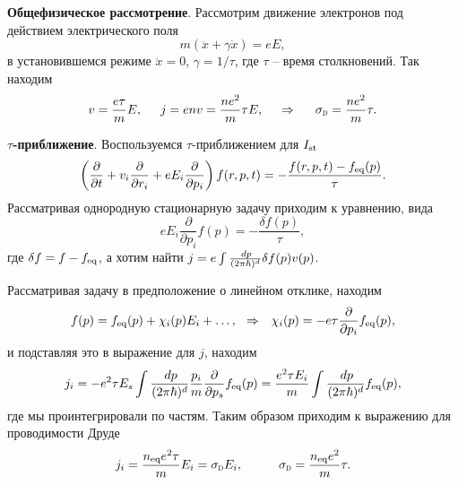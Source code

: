 

\textbf{Общефизическое рассмотрение}. 
Рассмотрим движение электронов под действием электрического поля
\begin{equation*}
	m (\ddot{x} + \gamma \dot{x}) = e E,
\end{equation*}
в установившемся режиме $\ddot{x} = 0$, $\gamma = 1/\tau$, где $\tau$ -- время столкновений. Так находим
\begin{equation*}
	v = \frac{e \tau}{m}E,
	\hspace{5 mm} 
	j = e n v = \frac{n e^2}{m} \tau E,
	\hspace{0.5cm} \Rightarrow \hspace{0.5cm}
	\sigD = \frac{n e^2}{m} \tau.
\end{equation*}

\textbf{$\tau$-приближение}. Воспользуемся $\tau$-приближением для $I_{\textnormal{st}}$
\begin{equation*}
	\left(
		\frac{\partial }{\partial t} + v_i \frac{\partial }{\partial r_i} + e E_i \frac{\partial }{\partial p_i} 
	\right) f(r, p, t) = - \frac{f(r, p, t) - f_{\textnormal{eq}} (p)}{\tau}.
\end{equation*}
Рассматривая однородную стационарную задачу приходим к уравнению, вида
\begin{equation*}
	e E_i \frac{\partial }{\partial p_i} f(p) = - \frac{\delta f(p)}{\tau},
\end{equation*}
где $\delta f = f - f_{\textnormal{eq}}$, а хотим найти $j = e \int \frac{\, d p}{(2 \pi \hbar)^d} \delta f(p) v(p)$.

Рассматривая задачу в предположение о линейном отклике, находим
\begin{equation*}
	f(p) = f_{\textnormal{eq}} (p) + \chi_i (p) E_i + \ldots,
	\hspace{0.25cm} \Rightarrow \hspace{0.25cm}
	\chi_i (p) = - e \tau \frac{\partial }{\partial p_i} f_{\textnormal{eq}} (p),
\end{equation*}
и подставляя это в выражение для $j$, находим
\begin{equation*}
	j_i = - e^2 \tau E_s \int \frac{\, d p}{(2 \pi \hbar)^d} \frac{p_i}{m} \frac{\partial }{\partial p_s} f_{\textnormal{eq}} (p) = \frac{e^2 \tau E_i}{m} \int \frac{\, d p}{(2 \pi \hbar)^d} f_{\textnormal{eq}} (p),
\end{equation*}
где мы проинтегрировали по частям. Таким образом приходим к выражению для проводимости Друде
\begin{equation*}
	 j_i = \frac{\sub{n}{eq} e^2 \tau}{m} E_i = \sigD E_i,
	 \hspace{10 mm} 
	 \sigD = \frac{\sub{n}{eq} e^2}{m} \tau.
\end{equation*}

